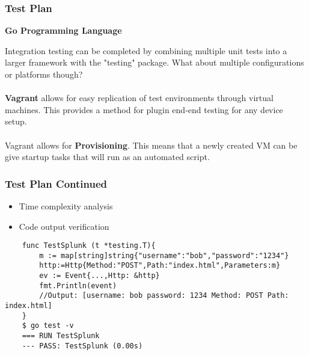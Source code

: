 \begin{frame}

\frametitle{Test Plan}
\textbf{Go Programming Language}

Integration testing can be completed by combining multiple unit tests into a larger framework with the "testing" package. 
What about multiple configurations or platforms though?\\~\\

\textbf {Vagrant} allows for easy replication of test environments through virtual machines. This provides a method for plugin end-end testing for any device setup. \\~\\

Vagrant allows for \textbf{Provisioning}. This means that a newly created VM can be give startup tasks that will run as an automated script.

\end{frame}

\begin{frame}[fragile]
\frametitle{Test Plan Continued}
\begin{itemize} %
	\item Time complexity analysis
	\item Code output verification
	\end{itemize}

\begin{example} %
\begin{verbatim}
	func TestSplunk (t *testing.T){
		m := map[string]string{"username":"bob","password":"1234"}
		http:=Http{Method:"POST",Path:"index.html",Parameters:m}
		ev := Event{...,Http: &http}
		fmt.Println(event)
		//Output: [username: bob password: 1234 Method: POST Path: index.html]	
	}
	$ go test -v
	=== RUN TestSplunk
	--- PASS: TestSplunk (0.00s)
\end{verbatim}
\end{example}
\end{frame}

